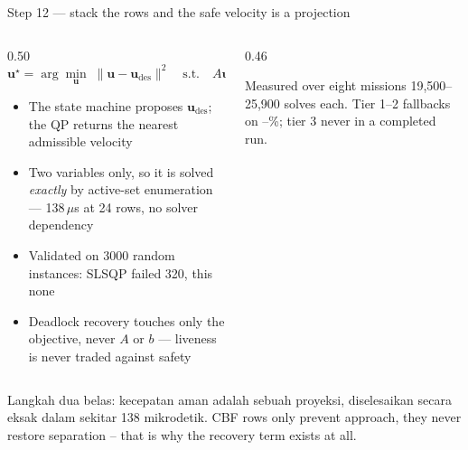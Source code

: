 \documentclass[aspectratio=169,11pt,t]{beamer}
\renewcommand{\sectioncount}{9}
\begin{document}
\begin{frame}{Step 12 --- stack the rows and the safe velocity is a projection}
  \begin{columns}[T,onlytextwidth]
    \begin{column}{0.50\textwidth}
      \vskip1mm {\small
      \[ \mathbf{u}^{\star}=\arg\min_{\mathbf{u}}\;
         \|\mathbf{u}-\mathbf{u}_{\mathrm{des}}\|^2
         \quad\text{s.t.}\quad A\mathbf{u}\le b \]}
      \begin{itemize}\bulletgap\scriptsize
        \item The state machine proposes $\mathbf{u}_{\mathrm{des}}$; the QP
              returns the nearest admissible velocity
        \item Two variables only, so it is solved \emph{exactly} by active-set
              enumeration --- \num{138}\,$\mu$s at 24 rows, no solver dependency
        \item Validated on 3000 random instances: SLSQP failed 320, this none
        \item Deadlock recovery touches only the objective, never $A$ or $b$ ---
              liveness is never traded against safety
      \end{itemize}
    \end{column}
    \begin{column}{0.46\textwidth}
      \vskip2mm
      \begin{callout}{Measured over eight missions}
        19{,}500--25{,}900 solves each. Tier 1--2 fallbacks on
        \PtierRectHinf--\PtierPlusLqr\%; tier 3 never in a completed run.
      \end{callout}
    \end{column}
  \end{columns}
    {Langkah dua belas: kecepatan aman adalah sebuah proyeksi, diselesaikan secara eksak dalam sekitar 138 mikrodetik.}
    {CBF rows only prevent approach, they never restore separation --
        that is why the recovery term exists at all.}
\end{frame}

\kick{High level}{5 / \sectioncount}
\end{document}
